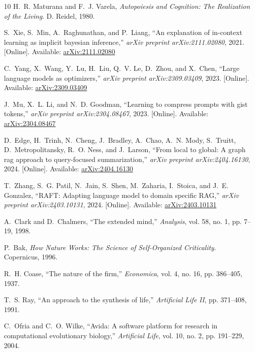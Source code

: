 \documentclass[10pt,journal,compsoc]{IEEEtran}
\begin{document}
\begin{thebibliography}{10}
H.~R. Maturana and F.~J. Varela, {\em Autopoiesis and Cognition: The Realization of the Living}. D. Reidel, 1980.

S.~Xie, S.~Min, A.~Raghunathan, and P.~Liang, ``An explanation of in-context learning as implicit bayesian inference,'' {\em arXiv preprint arXiv:2111.02080}, 2021. [Online]. Available: \href{https://arxiv.org/abs/2111.02080}{arXiv:2111.02080}

C.~Yang, X.~Wang, Y.~Lu, H.~Liu, Q.~V. Le, D.~Zhou, and X.~Chen, ``Large language models as optimizers,'' {\em arXiv preprint arXiv:2309.03409}, 2023. [Online]. Available: \href{https://arxiv.org/abs/2309.03409}{arXiv:2309.03409}

J.~Mu, X.~L. Li, and N.~D. Goodman, ``Learning to compress prompts with gist tokens,'' {\em arXiv preprint arXiv:2304.08467}, 2023. [Online]. Available: \href{https://arxiv.org/abs/2304.08467}{arXiv:2304.08467}

D.~Edge, H.~Trinh, N.~Cheng, J.~Bradley, A.~Chao, A.~N. Mody, S.~Truitt, D.~Metropolitansky, R.~O. Ness, and J.~Larson, ``From local to global: A graph rag approach to query-focused summarization,'' {\em arXiv preprint arXiv:2404.16130}, 2024. [Online]. Available: \href{https://arxiv.org/abs/2404.16130}{arXiv:2404.16130}

T.~Zhang, S.~G. Patil, N.~Jain, S.~Shen, M.~Zaharia, I.~Stoica, and J.~E. Gonzalez, ``RAFT: Adapting language model to domain specific RAG,'' {\em arXiv preprint arXiv:2403.10131}, 2024. [Online]. Available: \href{https://arxiv.org/abs/2403.10131}{arXiv:2403.10131}

A.~Clark and D.~Chalmers, ``The extended mind,'' {\em Analysis}, vol. 58, no. 1, pp. 7--19, 1998.

P.~Bak, {\em How Nature Works: The Science of Self-Organized Criticality}. Copernicus, 1996.

R.~H. Coase, ``The nature of the firm,'' {\em Economica}, vol. 4, no. 16, pp. 386--405, 1937.

T.~S. Ray, ``An approach to the synthesis of life,'' {\em Artificial Life II}, pp. 371--408, 1991.

C.~Ofria and C.~O. Wilke, ``Avida: A software platform for research in computational evolutionary biology,'' {\em Artificial Life}, vol. 10, no. 2, pp. 191--229, 2004.


\end{thebibliography}
\end{document}
